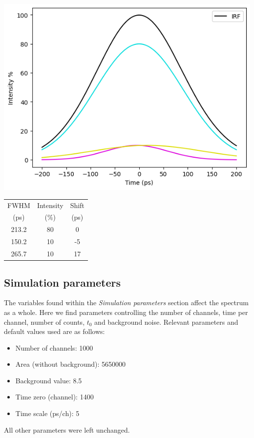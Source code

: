 \begin{minipage}{0.6\textwidth}
    \includegraphics[width=\textwidth]{Batch 3/regular IRF/irf.png}
\end{minipage}
\begin{minipage}{0.35\textwidth}
    \centering
    \label{tab:irfcomp}
    \begin{tabular}{|c|c|c|}
        \hline
        FWHM& Intensity& Shift \\
        (ps) & (\%) & (ps)\\
        \hline
        213.2 & 80 &  0\\
        150.2 & 10 & -5\\
        265.7 & 10 & 17\\
        \hline
    \end{tabular}
    \vspace{2.2cm}
    \label{fig:irf}
\end{minipage}


\subsection{Simulation parameters}

The variables found within the \textit{Simulation parameters} section affect the spectrum as a whole. Here we find parameters controlling the number of channels, time per channel, number of counts, $t_0$ and background noise. Relevant parameters and default values used are as follows:

\begin{itemize}
    \item Number of channels: 1000 
    \item Area (without background): 5650000 
    \item Background value: 8.5 
    \item Time zero (channel): 1400 
    \item Time scale (ps/ch): 5 
\end{itemize}
All other parameters were left unchanged.

